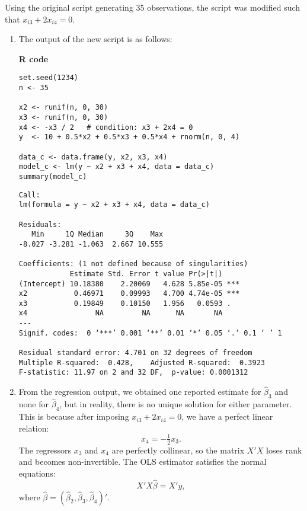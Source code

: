 Using the original script generating 35 observations, the script was modified such that $x_{i3} + 2x_{i4} = 0$.

\begin{enumerate}[label=(\roman*)]

\item The output of the new script is as follows:

\noindent\textbf{R code}

\begin{verbatim}
set.seed(1234)
n <- 35

x2 <- runif(n, 0, 30)
x3 <- runif(n, 0, 30)
x4 <- -x3 / 2   # condition: x3 + 2x4 = 0
y  <- 10 + 0.5*x2 + 0.5*x3 + 0.5*x4 + rnorm(n, 0, 4)

data_c <- data.frame(y, x2, x3, x4)
model_c <- lm(y ~ x2 + x3 + x4, data = data_c)
summary(model_c)
\end{verbatim}


\begin{verbatim}
Call:
lm(formula = y ~ x2 + x3 + x4, data = data_c)

Residuals:
   Min     1Q Median     3Q    Max 
-8.027 -3.281 -1.063  2.667 10.555 

Coefficients: (1 not defined because of singularities)
            Estimate Std. Error t value Pr(>|t|)    
(Intercept) 10.18380    2.20069   4.628 5.85e-05 ***
x2           0.46971    0.09993   4.700 4.74e-05 ***
x3           0.19849    0.10150   1.956   0.0593 .  
x4                NA         NA      NA       NA    
---
Signif. codes:  0 ‘***’ 0.001 ‘**’ 0.01 ‘*’ 0.05 ‘.’ 0.1 ‘ ’ 1

Residual standard error: 4.701 on 32 degrees of freedom
Multiple R-squared:  0.428,    Adjusted R-squared:  0.3923 
F-statistic: 11.97 on 2 and 32 DF,  p-value: 0.0001312
\end{verbatim}

\item

From the regression output, we obtained one reported estimate for $\hat{\beta}_3$ 
and none for $\hat{\beta}_4$, but in reality, there is no unique solution for either parameter. 
This is because after imposing $x_{i3} + 2x_{i4} = 0$, we have a perfect linear relation:
\[
x_4 = -\tfrac{1}{2}x_3.
\]
The regressors $x_3$ and $x_4$ are perfectly collinear, so the matrix $X'X$ loses rank 
and becomes non-invertible. The OLS estimator satisfies the normal equations:
\[
X'X\hat{\beta} = X'y,
\]
where $\hat{\beta} = (\hat{\beta}_2, \hat{\beta}_3, \hat{\beta}_4)'$.


\end{enumerate}
